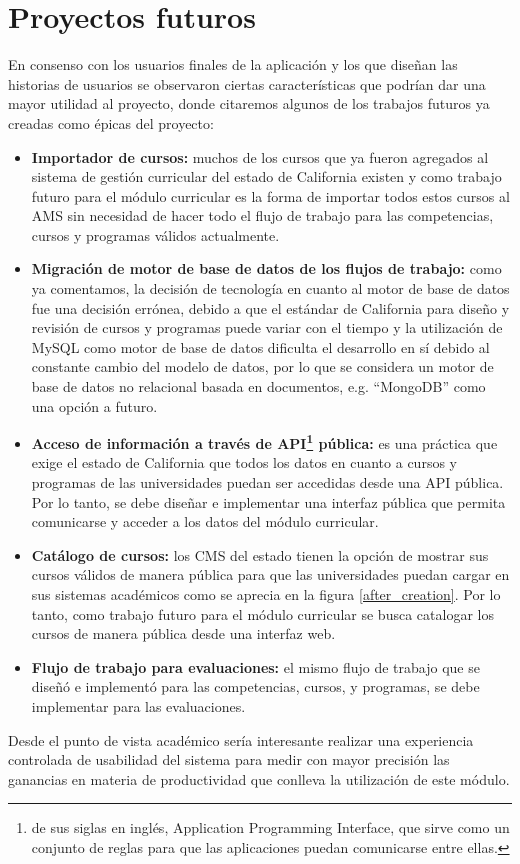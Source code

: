 \section{Proyectos futuros}
En consenso con los usuarios finales de la aplicación y los que diseñan las historias de usuarios se observaron ciertas características que podrían dar una mayor utilidad al proyecto, donde citaremos algunos de los trabajos futuros ya creadas como épicas del proyecto:
\begin{itemize}
	\item \textbf{Importador de cursos:} muchos de los cursos que ya fueron agregados al sistema de gestión curricular del estado de California existen y como trabajo futuro para el módulo curricular es la forma de importar todos estos cursos al AMS sin necesidad de hacer todo el flujo de trabajo para las competencias, cursos y programas válidos actualmente.
	\item \textbf{Migración de motor de base de datos de los flujos de trabajo:} como ya comentamos, la decisión de tecnología en cuanto al motor de base de datos fue una decisión errónea, debido a que el estándar de California para diseño y revisión de cursos y programas puede variar con el tiempo y la utilización de MySQL como motor de base de datos dificulta el desarrollo en sí debido al constante cambio del modelo de datos, por lo que se considera un motor de base de datos no relacional basada en documentos, e.g. \enquote{MongoDB} como una opción a futuro.
	\item \textbf{Acceso de información a través de API\footnote{de sus siglas en inglés, Application Programming Interface, que sirve como un conjunto de reglas para que las aplicaciones puedan comunicarse entre ellas.} pública:} es una práctica que exige el estado de California que todos los datos en cuanto a cursos y programas de las universidades puedan ser accedidas desde una API pública. Por lo tanto, se debe diseñar e implementar una interfaz pública que permita comunicarse y acceder a los datos del módulo curricular.
	\item \textbf{Catálogo de cursos:} los CMS del estado tienen la opción de mostrar sus cursos válidos de manera pública para que las universidades puedan cargar en sus sistemas académicos como se aprecia en la figura \ref{after_creation}. Por lo tanto, como trabajo futuro para el módulo curricular se busca catalogar los cursos de manera pública desde una interfaz web.
	\item \textbf{Flujo de trabajo para evaluaciones:} el mismo flujo de trabajo que se diseñó e implementó para las competencias, cursos, y programas, se debe implementar para las evaluaciones.
\end{itemize}
Desde el punto de vista académico sería interesante realizar una experiencia controlada de usabilidad del sistema para medir con mayor precisión las ganancias en materia de productividad que conlleva la utilización de este módulo.